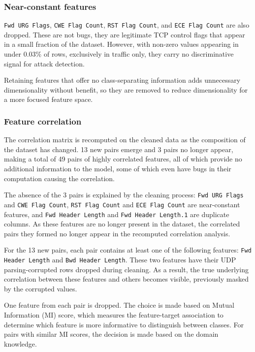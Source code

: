 \subsubsection{Near-constant features}

\texttt{Fwd URG Flags}, \texttt{CWE Flag Count}, \texttt{RST Flag Count}, and \texttt{ECE Flag Count} are also dropped. These are not bugs, they are legitimate TCP control flags that appear in a small fraction of the dataset. However, with non-zero values appearing in under 0.03\% of rows, exclusively in  traffic only, they carry no discriminative signal for attack detection.

Retaining features that offer no class-separating information adds unnecessary dimensionality without benefit, so they are removed to reduce dimensionality for a more focused feature space.

\subsubsection{Feature correlation}

The correlation matrix is recomputed on the cleaned data as the composition of the dataset has changed. 13 new pairs emerge and 3 pairs no longer appear, making a total of 49 pairs of highly correlated features, all of which provide no additional information to the model, some of which even have bugs in their computation causing the correlation.

The absence of the 3 pairs is explained by the cleaning process: \texttt{Fwd URG Flags} and \texttt{CWE Flag Count}, \texttt{RST Flag Count} and \texttt{ECE Flag Count} are near-constant features, and \texttt{Fwd Header Length} and \texttt{Fwd Header Length.1} are duplicate columns. As these features are no longer present in the dataset, the correlated pairs they formed no longer appear in the recomputed correlation analysis.

For the 13 new pairs, each pair contains at least one of the following features: \texttt{Fwd Header Length} and \texttt{Bwd Header Length}. These two features have their UDP parsing-corrupted rows dropped during cleaning. As a result, the true underlying correlation between these features and others becomes visible, previously masked by the corrupted values.

One feature from each pair is dropped. The choice is made based on Mutual Information (MI) score, which measures the feature-target association to determine which feature is more informative to distinguish between classes. For pairs with similar MI scores, the decision is made based on the domain knowledge.

